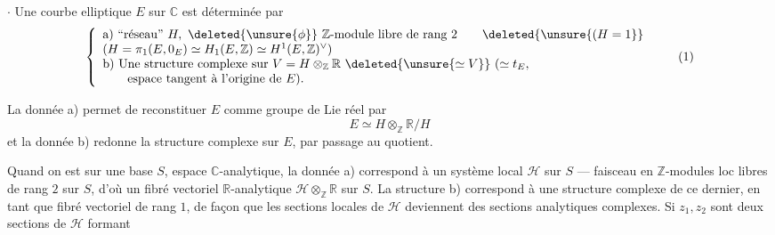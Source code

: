 $\cdot$ Une courbe elliptique $E$ sur $\mathbb C$ est déterminée par
\begin{equation}
\left\{
\begin{array}{l}
\text{a) ``réseau'' }H,\ \deleted{\unsure{\phi}}\ \mathbb Z\text{-module libre de rang }2
\qquad\deleted{\unsure{(H=1}}\\
(H=\pi_1(E,0_E)\simeq H_1(E,\mathbb Z)\simeq H^1(E,\mathbb Z)^\vee)\\
\text{b) Une structure complexe sur }V=H\otimes_{\mathbb Z}\mathbb R\ \deleted{\unsure{\simeq V}}\
(\simeq t_E,\\
\qquad\text{espace tangent à l'origine de }E).
\end{array}
\right.
\tag{1}
\end{equation}

La donnée a) permet de reconstituer $E$ comme groupe de Lie réel par
\begin{equation}
E\simeq H\otimes_{\mathbb Z}\mathbb R/H
\tag{2}
\end{equation}
et la donnée b) redonne la structure complexe sur $E$, par passage au quotient.

Quand on est sur une base $S$, espace $\mathbb C$-analytique, la donnée a) correspond à un système local $\mathcal H$ sur $S$ --- faisceau en $\mathbb Z$-modules loc libres de rang $2$ sur $S$, d'où un fibré vectoriel $\mathbb R$-analytique $\mathcal H\otimes_{\mathbb Z}\mathbb R$ sur $S$. La structure b) correspond à une structure complexe  de ce dernier, en tant que fibré vectoriel  de rang $1$, de façon que les sections locales de $\mathcal H$ deviennent des sections analytiques complexes. Si  $z_1,z_2$ sont deux sections de $\mathcal H$ formant
